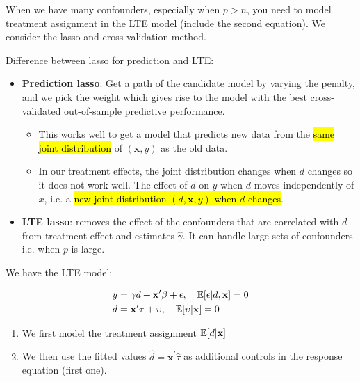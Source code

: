 \documentclass[11pt]{article}
\begin{document}
When we have many confounders, especially when $p>n$, you need to model treatment assignment in the LTE model (include the second equation). We consider the lasso and cross-validation method.

\begin{shaded}
Difference between lasso for prediction and LTE:
\begin{itemize}
    \item \textbf{Prediction lasso}: Get a path of the candidate model by varying the penalty, and we pick the weight which gives rise to the model with the best cross-validated out-of-sample predictive performance.
    \begin{itemize}
        \item This works well to get a model that predicts new data from the \hl{same joint distribution} of $(\mathbf{x}, y)$ as the old data.
        \item In our treatment effects, the joint distribution changes when $d$ changes so it does not work well. The effect of $d$ on $y$ when $d$ moves independently of $x$, i.e. a \hl{new joint distribution $(d, \mathbf{x}, y)$ when $d$ changes}.
    \end{itemize}
    \item \textbf{LTE lasso}: removes the effect of the confounders that are correlated with $d$ from treatment effect and estimates $\hat{\gamma}$. It can handle large sets of confounders i.e. when $p$ is large.
\end{itemize}
\end{shaded}

\begin{procedure}
    We have the LTE model:

    \begin{align*}
    y &= \gamma d + \mathbf{x^\prime}\beta + \epsilon, \quad \mathbb{E}[\epsilon|d,\mathbf{x}] = 0 \\
    d &= \mathbf{x^\prime}\tau + \upsilon, \quad \mathbb{E}[\upsilon|\mathbf{x}] = 0
    \end{align*}

    \begin{enumerate}
        \item We first model the treatment assignment $\mathbb{E}[d|\mathbf{x}]$
        \item We then use the fitted values $\hat{d} = \mathbf{x^\prime}\hat{\tau}$ as additional controls in the response equation (first one).
    \end{enumerate}
\end{procedure}
\end{document}
